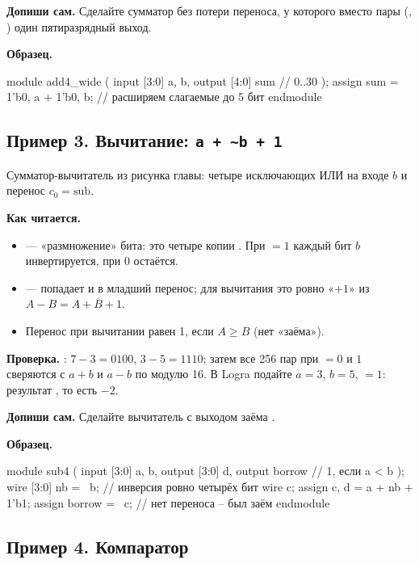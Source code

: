 \textbf{Допиши сам.} Сделайте сумматор без потери переноса, у которого вместо
пары (, ) один пятиразрядный выход.

\textbf{Образец.}
\begin{vcode}
module add4_wide (
    input  [3:0] a, b,
    output [4:0] sum        // 0..30
);
    assign sum = {1'b0, a} + {1'b0, b};   // расширяем слагаемые до 5 бит
endmodule
\end{vcode}

\subsection{Пример 3. Вычитание: \texttt{a + \textasciitilde b + 1}}

Сумматор-вычитатель из рисунка главы: четыре исключающих ИЛИ на входе $b$ и
перенос $c_0=\text{sub}$.


\textbf{Как читается.}
\begin{itemize}
  \item {} --- «размножение» бита:  это четыре копии . При  $=1$ каждый бит $b$ инвертируется, при $0$ остаётся.
  \item {} ---  попадает и в младший перенос; для вычитания это ровно «$+1$» из $A-B=A+\overline B+1$.
  \item Перенос  при вычитании равен 1, если $A\ge B$ (нет «заёма»).
\end{itemize}
\textbf{Проверка.} : $7-3=0100$, $3-5=1110$; затем все
256 пар при  $=0$ и $1$ сверяются с $a+b$ и $a-b$ по модулю 16.
В Logra подайте $a=3$, $b=5$,  $=1$: результат , то есть $-2$.

\textbf{Допиши сам.} Сделайте вычитатель с выходом заёма .

\textbf{Образец.}
\begin{vcode}
module sub4 (
    input  [3:0] a, b,
    output [3:0] d,
    output       borrow       // 1, если a < b
);
    wire [3:0] nb = ~b;                  // инверсия ровно четырёх бит
    wire       c;
    assign {c, d} = a + nb + 1'b1;
    assign borrow = ~c;                  // нет переноса -- был заём
endmodule
\end{vcode}

\subsection{Пример 4. Компаратор}

